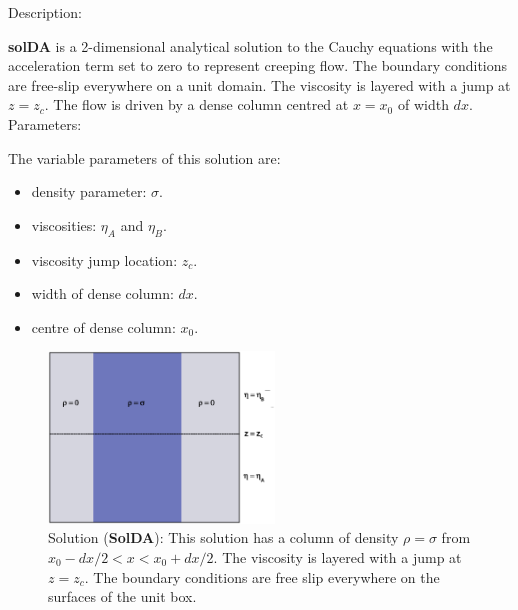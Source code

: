   {\large \fontB Description:}
  
  {\bf solDA} is a 2-dimensional analytical solution to the Cauchy equations with the acceleration term set to zero
  to represent creeping flow. The boundary conditions are free-slip everywhere on a unit domain.
  The viscosity is layered with a jump at $ z=z_c $.
  The flow is driven by a dense column centred at $ x=x_0 $ of width $dx$.
  \\
  
 {\large \fontB Parameters:}
  
 The variable parameters of this solution are:
 \begin{itemize}
   \item{density parameter: $ \sigma $.}
   \item{viscosities: $\eta_A$ and $\eta_B$.}
   \item{viscosity jump location: $z_c$.}
   \item{width of dense column: $dx$.}
   \item{centre of dense column: $x_0$.}
 \end{itemize}

  \begin{figure}
    \includegraphics[width=6cm,clip]{../figs/figDA.eps}
    \caption[Short caption]{\label{figDA} 
      Solution ({\bf SolDA}):
      This solution has a column of density $\rho = \sigma$ from $x_0-dx/2 < x < x_0+dx/2$.
      The viscosity is layered with a jump at $ z=z_c $.
      The boundary conditions are free slip everywhere on the surfaces of the unit box.}
  \end{figure} 
  

